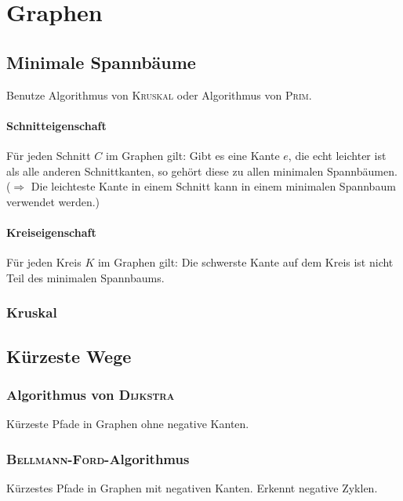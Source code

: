 \section{Graphen}

\subsection{Minimale Spannbäume}
Benutze Algorithmus von \textsc{Kruskal} oder Algorithmus von \textsc{Prim}.

\paragraph{Schnitteigenschaft}
Für jeden Schnitt $C$ im Graphen gilt:
Gibt es eine Kante $e$, die echt leichter ist als alle anderen Schnittkanten, so gehört diese zu allen minimalen Spannbäumen.
($\Rightarrow$ Die leichteste Kante in einem Schnitt kann in einem minimalen Spannbaum verwendet werden.)

\paragraph{Kreiseigenschaft}
Für jeden Kreis $K$ im Graphen gilt:
Die schwerste Kante auf dem Kreis ist nicht Teil des minimalen Spannbaums.

\subsubsection{Kruskal}


\subsection{Kürzeste Wege}

\subsubsection{Algorithmus von \textsc{Dijkstra}}
Kürzeste Pfade in Graphen ohne negative Kanten.


\subsubsection{\textsc{Bellmann-Ford}-Algorithmus}
Kürzestes Pfade in Graphen mit negativen Kanten.
Erkennt negative Zyklen.


